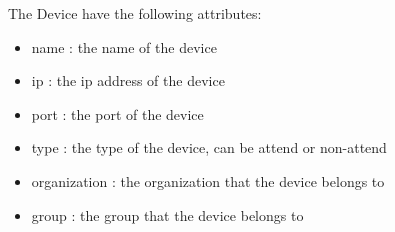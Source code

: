 The Device have the following attributes:

\begin{itemize}
    \item name : the name of the device
    \item ip : the ip address of the device
    \item port : the port of the device
    \item type : the type of the device, can be attend or non-attend
    \item organization : the organization that the device belongs to
    \item group : the group that the device belongs to
\end{itemize}



